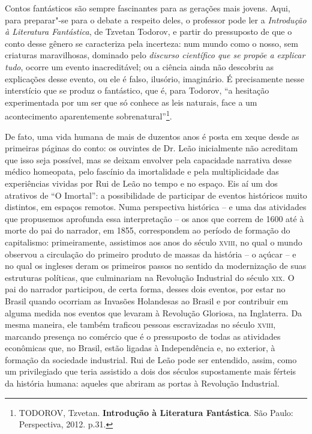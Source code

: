 \documentclass{extarticle}
\begin{document}
Contos fantásticos são sempre fascinantes para as gerações mais jovens.
Aqui, para preparar"-se para o debate a respeito deles, o professor pode
ler a \emph{Introdução à Literatura Fantástica}, de Tzvetan Todorov, e
partir do pressuposto de que o conto desse gênero se caracteriza pela
incerteza: num mundo como o nosso, sem criaturas maravilhosas, dominado
pelo \emph{discurso científico que se propõe a explicar tudo}, ocorre um
evento inacreditável; ou a ciência ainda não descobriu as explicações
desse evento, ou ele é falso, ilusório, imaginário. É precisamente nesse
interstício que se produz o fantástico, que é, para Todorov, ``a
hesitação experimentada por um ser que só conhece as leis naturais, face
a um acontecimento aparentemente sobrenatural''\footnote{TODOROV,
  Tzvetan. \textbf{Introdução à Literatura Fantástica}. São Paulo:
  Perspectiva, 2012. p.31.}.

De fato, uma vida humana de mais de duzentos anos é posta em xeque desde
as primeiras páginas do conto: os ouvintes de Dr. Leão inicialmente não
acreditam que isso seja possível, mas se deixam envolver pela capacidade
narrativa desse médico homeopata, pelo fascínio da imortalidade e pela
multiplicidade das experiências vividas por Rui de Leão no tempo e no
espaço. Eis aí um dos atrativos de ``O Imortal'': a possibilidade de
participar de eventos históricos muito distintos, em espaços remotos.
Numa perspectiva histórica -- e uma das atividades que propusemos
aprofunda essa interpretação -- os anos que correm de 1600 até à morte
do pai do narrador, em 1855, correspondem ao período de formação do
capitalismo: primeiramente, assistimos aos anos do século \textsc{xviii}, no qual
o mundo observou a circulação do primeiro produto de massas da história
-- o açúcar -- e no qual os ingleses deram os primeiros passos no
sentido da modernização de suas estruturas políticas, que culminariam na
Revolução Industrial do século \textsc{xix}. O pai do narrador participou, de
certa forma, desses dois eventos, por estar no Brasil quando ocorriam as
Invasões Holandesas ao Brasil e por contribuir em alguma medida nos
eventos que levaram à Revolução Gloriosa, na Inglaterra. Da mesma
maneira, ele também traficou pessoas escravizadas no século \textsc{xviii},
marcando presença no comércio que é o pressuposto de todas as atividades
econômicas que, no Brasil, estão ligadas à Independência e, no exterior,
à formação da sociedade industrial. Rui de Leão pode ser entendido,
assim, como um privilegiado que teria assistido a dois dos séculos
supostamente mais férteis da história humana: aqueles que abriram as
portas à Revolução Industrial.
\end{document}
